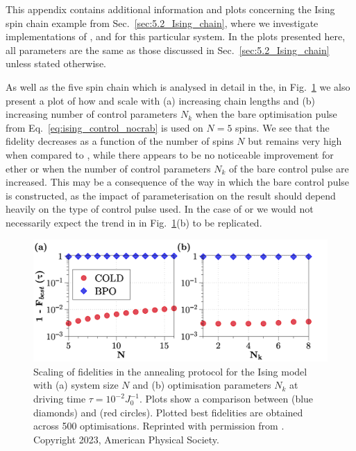 This appendix contains additional information and plots concerning the Ising spin chain example from Sec.~\ref{sec:5.2_Ising_chain}, where we investigate implementations of ,  and  for this particular system. In the plots presented here, all parameters are the same as those discussed in Sec.~\ref{sec:5.2_Ising_chain} unless stated otherwise.

As well as the five spin chain which is analysed in detail in the, in Fig.~\ref{fig:ising_scalingN} we also present a plot of how   and  scale with (a) increasing chain lengths and (b) increasing number of control parameters $N_k$ when the bare optimisation pulse from Eq.~\eqref{eq:ising_control_nocrab} is used on $N=5$ spins. We see that the  fidelity decreases as a function of the number of spins $N$ but remains very high when compared to , while there appears to be no noticeable improvement for ether  or  when the number of control parameters $N_k$ of the bare control pulse are increased. This may be a consequence of the way in which the bare control pulse is constructed, as the impact of parameterisation on the result should depend heavily on the type of control pulse used. In the case of  or  we would not necessarily expect the trend in in Fig.~\ref{fig:ising_scalingN}(b) to be replicated.

\begin{figure}[t!]
    \centering
    \includegraphics[width=\linewidth]{images/ScalingN.png} \caption[Plots of how final state fidelities scale using COLD and BPO for different system sizes and optimisable parameters.]{Scaling of fidelities in the annealing protocol for the Ising model with (a) system size $N$ and (b) optimisation parameters $N_k$ at driving time $\tau=10^{-2}J_0^{-1}$. Plots show a comparison between  (blue diamonds) and  (red circles). Plotted best fidelities are obtained across 500 optimisations. Reprinted with permission from \cite{cepaite_counterdiabatic_2023}. Copyright 2023, American Physical Society.}\label{fig:ising_scalingN}
\end{figure}

